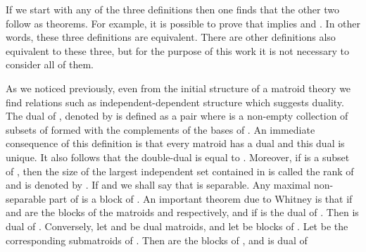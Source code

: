 \documentclass[a4paper,12pt]{article}
\begin{document}
If we start with any of the three definitions then one finds that the other
two follow as theorems. For example, it is possible to prove that \coordHE{} implies \coordHE{} and \coordHE{}. In other words, these three
definitions are equivalent. There are other definitions also equivalent to
these three, but for the purpose of this work it is not necessary to
consider all of them.

As we noticed previously, even from the initial structure of a matroid
theory we find relations such as independent-dependent structure which
suggests duality. The dual of \coordHE{}, denoted by \coordHE{} is defined as a
pair \coordHE{} where \coordHE{} is a non-empty
collection of subsets of \coordHE{} formed with the complements of the bases of \coordHE{}%
. An immediate consequence of this definition is that every matroid has a
dual and this dual is unique. It also follows that the double-dual \coordHE{} is equal to \coordHE{}. Moreover, if \coordHE{} is a subset of \coordHE{}, then the size
of the largest independent set contained in \coordHE{} is called the rank of \coordHE{}
and is denoted by \coordHE{}. If \coordHE{} and \coordHE{} we shall say that \coordHE{} is separable. Any maximal
non-separable part of \coordHE{} is a block of \coordHE{}. An important theorem due to
Whitney\coordHE{} is that if \coordHE{} and \coordHE{} are the blocks of the matroids \coordHE{} and \coordHE{} respectively, and if \coordHE{} is the dual of \coordHE{}  \coordHE{}. Then \coordHE{} is dual of \coordHE{}. Conversely, let \coordHE{} and \coordHE{} be dual matroids, and let \coordHE{} be blocks of \coordHE{}.
Let \coordHE{} be the corresponding
submatroids of \coordHE{}. Then \coordHE{}
are the blocks of \coordHE{}, and \coordHE{} is dual of \coordHE{}
\end{document}
